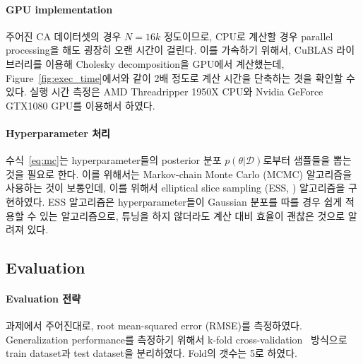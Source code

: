 \documentclass[ba, 11pt]{imsart}
\begin{document}
\paragraph{GPU implementation}
주어진 CA 데이터셋의 경우 \(N=16k\) 정도이므로, CPU로 계산할 경우 parallel processing을 해도 굉장히 오랜 시간이 걸린다.
이를 가속하기 위해서, CuBLAS 라이브러리를 이용해 Cholesky decomposition을 GPU에서 계산했는데, Figure~\ref{fig:exec_time}에서와 같이 2배 정도로 계산 시간을 단축하는 겻을 확인할 수 있다.
실행 시간 측정은 AMD Threadripper 1950X CPU와 Nvidia GeForce GTX1080 GPU를 이용해서 하였다.

\paragraph{Hyperparameter 처리}
수식~\eqref{eq:mc}는 hyperparameter들의 posterior 분포 \(p(\theta | \mathcal{D})\)로부터 샘플들을 뽑는 것을 필요로 한다.
이를 위해서는 Markov-chain Monte Carlo (MCMC) 알고리즘을 사용하는 것이 보통인데, 이를 위해서 elliptical slice sampling (ESS, \citealt{murray_elliptical_2010}) 알고리즘을 구현하였다.
ESS 알고리즘은 hyperparameter들이 Gaussian 분포를 따를 경우 쉽게 적용할 수 있는 알고리즘으로, 튜닝을 하지 않더라도 계산 대비 효율이 괜찮은 것으로 알려져 있다.


\subsection{Evaluation}\label{section:eval}
\paragraph{Evaluation 전략}
과제에서 주어진대로, root mean-squared error (RMSE)를 측정하였다.
Generalization performance를 측정하기 위해서 k-fold cross-validation~\citep{murphy_machine_2012} 방식으로 train dataset과 test dataset을 분리하였다.
Fold의 갯수는 5로 하였다.
\end{document}
